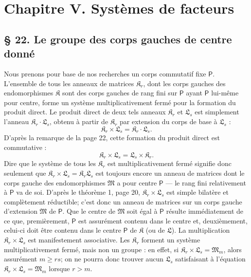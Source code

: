 
\section*{Chapitre V. Systèmes de facteurs}\label{fr-r823-chapitre-v-systemes-facteurs}

\subsection*{\S{} 22. Le groupe des corps gauches de centre donné}\label{fr-r823-groupe-corps-centre-donne}

Nous prenons pour base de nos recherches un corps commutatif fixe \(\mathsf P\). L'ensemble de tous les anneaux de matrices \(\mathfrak K_r\), dont les corps gauches des endomorphismes \(\mathfrak K\) sont des corps gauches de rang fini sur \(\mathsf P\) ayant \(\mathsf P\) lui-même pour centre, forme un système multiplicativement fermé pour la \og formation du produit direct\fg{}. Le produit direct de deux tels anneaux \(\mathfrak K_r\) et \(\mathfrak L_s\) est simplement l'anneau \(\mathfrak K_r\cdot\mathfrak L_s\), obtenu à partir de \(\mathfrak K_r\) par extension du corps de base à \(\mathfrak L_s\) :
\[
\mathfrak K_r\times\mathfrak L_s=\mathfrak K_r\cdot\mathfrak L_s.
\]
D'après la remarque de la page 22, cette formation du produit direct est commutative :
\[
\mathfrak K_r\times\mathfrak L_s=\mathfrak L_s\times\mathfrak K_r.
\]
Dire que le système de tous les \(\mathfrak K_r\) est multiplicativement fermé signifie donc seulement que \(\mathfrak K_r\times\mathfrak L_s=\mathfrak K_r\mathfrak L_s\) est toujours encore un anneau de matrices dont le corps gauche des endomorphismes \(\mathfrak M\) a pour centre \(\mathsf P\) --- le rang fini relativement à \(\mathsf P\) va de soi. D'après le théorème 1, page 20, \(\mathfrak K_r\times\mathfrak L_s\) est simple bilatère et complètement réductible; c'est donc un anneau de matrices sur un corps gauche d'extension \(\mathfrak M\) de \(\mathsf P\). Que le centre de \(\mathfrak M\) soit égal à \(\mathsf P\) résulte immédiatement de ce que, premièrement, \(\mathsf P\) est assurément contenu dans le centre et, deuxièmement, celui-ci doit être contenu dans le centre \(\mathsf P\) de \(\mathfrak K\) (ou de \(\mathfrak L\)). La multiplication \(\mathfrak K_r\times\mathfrak L_s\) est manifestement associative. Les \(\mathfrak K_r\) forment un système multiplicativement fermé, mais non un groupe : en effet, si \(\mathfrak K_r\times\mathfrak L_s=\mathfrak M_m\), alors assurément \(m\geq rs\); on ne pourra donc trouver aucun \(\mathfrak L_s\) satisfaisant à l'équation \(\mathfrak K_r\times\mathfrak L_s=\mathfrak M_m\) lorsque \(r>m\).


